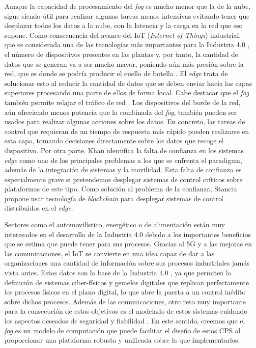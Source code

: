 Aunque la capacidad de procesamiento del \textit{fog} es mucho menor que la de
la nube, sigue siendo útil para realizar algunas tareas menos intensivas
evitando tener que desplazar todos los datos a la nube, con la latencia y la
carga en la red que eso supone. Como consecuencia del avance del IoT
(\textit{Internet of Things}) industrial, que es considerada una de las
tecnologías más importantes para la Industria 4.0 \cite{lu_industry_2017}, el
número de dispositivos presentes en las plantas y, por tanto, la cantidad de
datos que se generan va a ser mucho mayor, poniendo aún más presión sobre la
red, que es donde se podría producir el cuello de botella \cite{shi_edge_2016}.
El \textit{edge} trata de solucionar esto al reducir la cantidad de datos que se
deben enviar hacia las capas superiores procesando una parte de ellos de forma
local. Cabe destacar que el \textit{fog} también permite relajar el tráfico de
red \cite{wang_traffic_2019}. Los dispositivos del borde de la red, aún
ofreciendo menos potencia que la combinada del \textit{fog}, también pueden ser
usados para realizar algunas acciones sobre los datos. En concreto, las tareas
de control que requieran de un tiempo de respuesta más rápido pueden realizarse
en esta capa, tomando decisiones directamente sobre los datos que recoge el
dispositivo. Por otra parte, Khan \cite{khan_edge_2019} identifica la falta de
confianza en los sistemas \textit{edge} como uno de los principales problemas a
los que se enfrenta el paradigma, además de la integración de sistemas y la
movilidad. Esta falta de confianza es especialmente grave si pretendemos
desplegar sistemas de control críticos sobre plataformas de este tipo. Como
solución al problema de la confianza, Stanciu \cite{stanciu_blockchain_2017}
propone usar tecnología de \textit{blockchain} para desplegar sistemas de
control distribuidos en el \textit{edge}.

Sectores como el automovilístico, energético o de alimentación están muy
interesados en el desarrollo de la Industria 4.0 debido a los importantes
beneficios que se estima que puede tener para sus procesos. Gracias al 5G y a
las mejoras en las comunicaciones, el IoT se convierte en una idea capaz de dar
a las organizaciones una cantidad de información sobre sus procesos industriales
jamás vista antes. Estos datos son la base de la Industria 4.0
\cite{khan_perspective_2016}, ya que permiten la definición de sistemas
ciber-físicos y gemelos digitales que replican perfectamente los procesos
físicos en el plano digital, lo que abre la puerta a un control inédito sobre
dichos procesos. Además de las comunicaciones, otro reto muy importante para la
consecución de estos objetivos es el modelado de estos sistemas cuidando los
aspectos deseados de seguridad y fiabilidad \cite{farsi_industry_2019}. En este
sentido, creemos que el \textit{fog} es un modelo de computación que puede
facilitar el diseño de estos CPS al proporcionar una plataforma robusta y
unificada sobre la que implementarlos.

